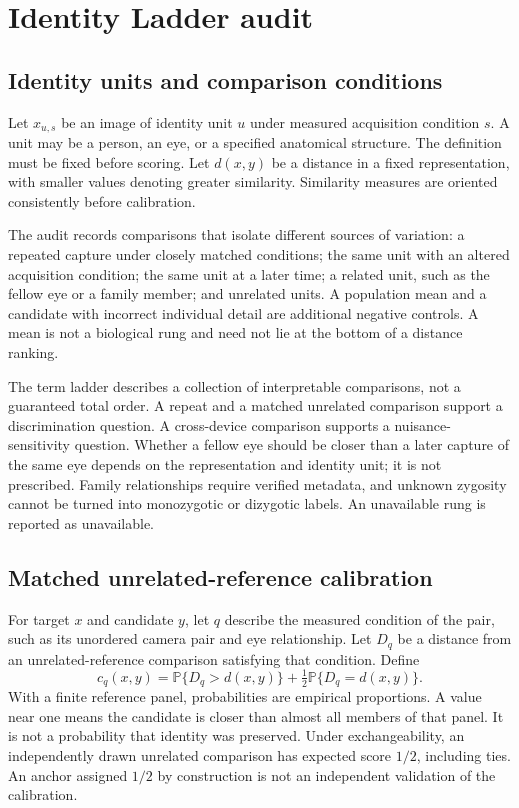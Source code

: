 \documentclass[10pt,twocolumn,letterpaper]{article}
\newcommand{\Prob}{\mathbb{P}}
\begin{document}
\section{Identity Ladder audit}
\subsection{Identity units and comparison conditions}
Let $x_{u,s}$ be an image of identity unit $u$ under measured acquisition condition $s$. A unit may be a person, an eye, or a specified anatomical structure. The definition must be fixed before scoring. Let $d(x,y)$ be a distance in a fixed representation, with smaller values denoting greater similarity. Similarity measures are oriented consistently before calibration.

The audit records comparisons that isolate different sources of variation: a repeated capture under closely matched conditions; the same unit with an altered acquisition condition; the same unit at a later time; a related unit, such as the fellow eye or a family member; and unrelated units. A population mean and a candidate with incorrect individual detail are additional negative controls. A mean is not a biological rung and need not lie at the bottom of a distance ranking.

The term ladder describes a collection of interpretable comparisons, not a guaranteed total order. A repeat and a matched unrelated comparison support a discrimination question. A cross-device comparison supports a nuisance-sensitivity question. Whether a fellow eye should be closer than a later capture of the same eye depends on the representation and identity unit; it is not prescribed. Family relationships require verified metadata, and unknown zygosity cannot be turned into monozygotic or dizygotic labels. An unavailable rung is reported as unavailable.

\subsection{Matched unrelated-reference calibration}
For target $x$ and candidate $y$, let $q$ describe the measured condition of the pair, such as its unordered camera pair and eye relationship. Let $D_q$ be a distance from an unrelated-reference comparison satisfying that condition. Define
\begin{equation}
c_q(x,y)=\Prob\{D_q>d(x,y)\}
 +\tfrac12\Prob\{D_q=d(x,y)\}.
\label{eq:calibration}
\end{equation}
With a finite reference panel, probabilities are empirical proportions. A value near one means the candidate is closer than almost all members of that panel. It is not a probability that identity was preserved. Under exchangeability, an independently drawn unrelated comparison has expected score $1/2$, including ties. An anchor assigned $1/2$ by construction is not an independent validation of the calibration.
\end{document}
